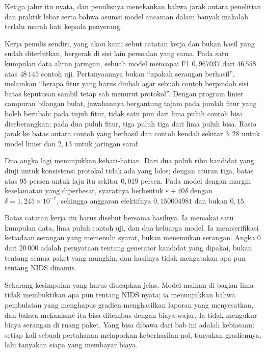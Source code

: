 Ketiga jalur itu nyata, dan penulisnya menekankan bahwa jarak antara penelitian dan
praktik lebar serta bahwa asumsi model ancaman dalam banyak makalah terlalu murah hati
kepada penyerang.

Kerja penulis sendiri, yang akan kami sebut catatan kerja dan bukan hasil yang sudah
diterbitkan, bergerak di sisi lain persoalan yang sama. Pada satu kumpulan data aliran
jaringan, sebuah model mencapai F1 $0{,}967037$ dari $46\,558$ atas $48\,145$ contoh uji.
Pertanyaannya bukan ``apakah serangan berhasil'', melainkan ``berapa fitur yang harus
diubah agar sebuah contoh berpindah sisi batas keputusan sambil tetap sah menurut
protokol''. Dengan program linier campuran bilangan bulat, jawabannya bergantung tajam
pada jumlah fitur yang boleh berubah: pada tujuh fitur, tidak satu pun dari lima puluh
contoh bisa diseberangkan; pada dua puluh fitur, tiga puluh tiga dari lima puluh bisa.
Rasio jarak ke batas antara contoh yang berhasil dan contoh kendali sekitar $3{,}28$
untuk model linier dan $2{,}13$ untuk jaringan saraf.

Dua angka lagi menunjukkan kehati-hatian. Dari dua puluh ribu kandidat yang diuji untuk
konsistensi protokol tidak ada yang lolos; dengan aturan tiga, batas atas $95$ persen
untuk laju itu sekitar $0{,}019$ persen. Pada model dengan margin keselamatan yang
diperbesar, syaratnya berbentuk $\varepsilon+40\delta$ dengan
$\delta=1{,}245\times10^{-7}$, sehingga anggaran efektifnya $0{,}150004981$ dan bukan
$0{,}15$.

Batas catatan kerja itu harus disebut bersama hasilnya. Ia memakai satu kumpulan data,
lima puluh contoh uji, dan dua keluarga model. Ia memverifikasi ketiadaan serangan yang
memenuhi syarat, bukan menemukan serangan. Angka $0$ dari $20\,000$ adalah pernyataan
tentang generator kandidat yang dipakai, bukan tentang semua paket yang mungkin, dan
hasilnya tidak mengatakan apa pun tentang NIDS dinamis.

Sekarang kesimpulan yang harus diucapkan jelas. Model mainan di bagian lima tidak
membuktikan apa pun tentang NIDS nyata; ia menunjukkan bahwa pembulatan yang menghapus
gradien menghasilkan laporan yang menyesatkan, dan bahwa mekanisme itu bisa ditembus
dengan biaya wajar. Ia tidak mengukur biaya serangan di ruang paket. Yang bisa dibawa
dari bab ini adalah kebiasaan: setiap kali sebuah pertahanan melaporkan keberhasilan nol,
tanyakan gradiennya, lalu tanyakan siapa yang membayar biaya.

